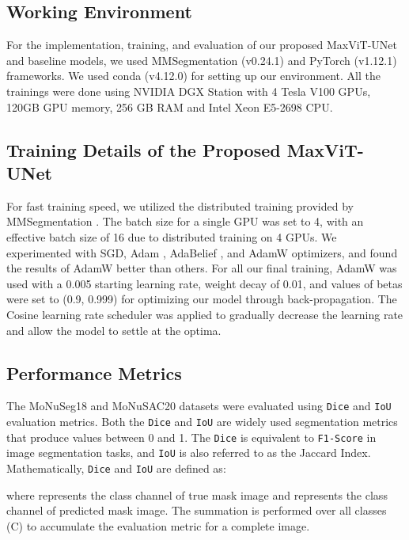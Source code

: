 \documentclass{article}
\begin{document}
\subsection{Working Environment}\label{Working Environment}

For the implementation, training, and evaluation of our proposed MaxViT-UNet and baseline models, we used MMSegmentation \cite{contributors2020openmmlab} (v0.24.1) and PyTorch \cite{pytorch} (v1.12.1) frameworks. We used conda (v4.12.0) for setting up our environment. All the trainings were done using NVIDIA DGX Station with 4 Tesla V100 GPUs, 120GB GPU memory, 256 GB RAM and Intel Xeon E5-2698 CPU.

\subsection{Training Details of the Proposed MaxViT-UNet}\label{Training Details of the Proposed MaxViT-UNet}

For fast training speed, we utilized the distributed training provided by MMSegmentation \cite{contributors2020openmmlab}. The batch size for a single GPU was set to 4, with an effective batch size of 16 due to distributed training on 4 GPUs. We experimented with SGD, Adam \cite{kingma2014adam}, AdaBelief \cite{zhuang2020adabelief}, and AdamW \cite{loshchilov2018decoupled} optimizers, and found the results of AdamW \cite{loshchilov2018decoupled} better than others. For all our final training, AdamW was used with a 0.005 starting learning rate, weight decay of 0.01, and values of betas were set to (0.9, 0.999) for optimizing our model through back-propagation. The Cosine learning rate scheduler was applied to gradually decrease the learning rate and allow the model to settle at the optima.

\subsection{Performance Metrics}\label{Performance Metrics}

The MoNuSeg18 and MoNuSAC20 datasets were evaluated using \texttt{Dice} and \texttt{IoU} evaluation metrics. Both the \texttt{Dice} and \texttt{IoU} are widely used segmentation metrics that produce values between 0 and 1. The \texttt{Dice} is equivalent to \texttt{F1-Score} in image segmentation tasks, and \texttt{IoU} is also referred to as the Jaccard Index. Mathematically, \texttt{Dice} and \texttt{IoU} are defined as:


where  represents the  class channel of true mask image and  represents the  class channel of predicted mask image. The summation is performed over all classes (C) to accumulate the evaluation metric for a complete image.
\end{document}
